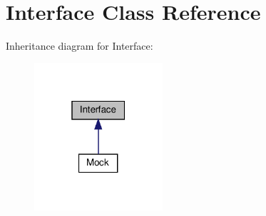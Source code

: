 \hypertarget{class_interface}{}\section{Interface Class Reference}
\label{class_interface}


Inheritance diagram for Interface\+:
\nopagebreak
\begin{figure}[H]
\begin{center}
\leavevmode
\includegraphics[width=135pt]{class_interface__inherit__graph}
\end{center}
\end{figure}
